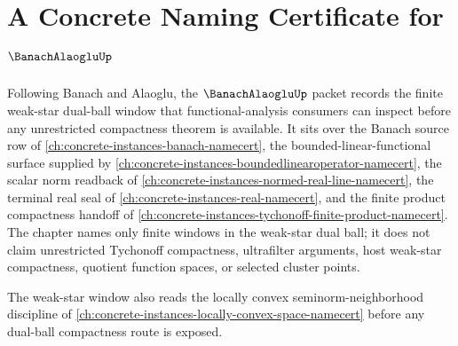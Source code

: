 \chapter{A Concrete Naming Certificate for $\BanachAlaogluUp$}
\label{ch:concrete-instances-banach-alaoglu-namecert}

Following Banach and Alaoglu, the $\BanachAlaogluUp$ packet records the finite weak-star dual-ball window that functional-analysis consumers can inspect before any unrestricted compactness theorem is available. It sits over the Banach source row of \autoref{ch:concrete-instances-banach-namecert}, the bounded-linear-functional surface supplied by \autoref{ch:concrete-instances-boundedlinearoperator-namecert}, the scalar norm readback of \autoref{ch:concrete-instances-normed-real-line-namecert}, the terminal real seal of \autoref{ch:concrete-instances-real-namecert}, and the finite product compactness handoff of \autoref{ch:concrete-instances-tychonoff-finite-product-namecert}. The chapter names only finite windows in the weak-star dual ball; it does not claim unrestricted Tychonoff compactness, ultrafilter arguments, host weak-star compactness, quotient function spaces, or selected cluster points.

The weak-star window also reads the locally convex seminorm-neighborhood discipline of \autoref{ch:concrete-instances-locally-convex-space-namecert} before any dual-ball compactness route is exposed.

